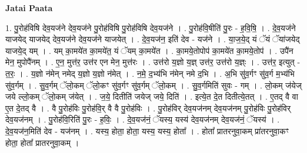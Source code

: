 \documentclass[17pt]{extarticle}
\begin{document}
\textbf{Jatai Paata} \newline

1. पु॒रोह॑विषि देव॒यज॑ने देव॒यज॑ने पु॒रोह॑विषि पु॒रोह॑विषि देव॒यज॑ने । . पु॒रोह॑वि॒षीति॑ पु॒रः - ह॒वि॒षि॒ । . दे॒व॒यज॑ने याजयेद् याजयेद् देव॒यज॑ने देव॒यज॑ने याजयेत् । . दे॒व॒यज॑न॒ इति॑ देव - यज॑ने । . या॒ज॒ये॒द् यं ॅयं ॅया॑जयेद् याजये॒द् यम् । . यम् का॒मये॑त का॒मये॑त॒ यं ॅयम् का॒मये॑त । . का॒मये॒तोपोप॑ का॒मये॑त का॒मये॒तोप॑ । . उपै॑न मेन॒ मुपोपै॑नम् । . ए॒न॒ मुत्त॑र॒ उत्त॑र एन मेन॒ मुत्त॑रः । . उत्त॑रो य॒ज्ञो य॒ज्ञ् उत्त॑र॒ उत्त॑रो य॒ज्ञ्ः । . उत्त॑र॒ इत्युत् - त॒रः॒ । . य॒ज्ञो न॑मेन् नमेद् य॒ज्ञो य॒ज्ञो न॑मेत् । . न॒मे॒ द॒भ्य॑भि न॑मेन् नमे द॒भि । . अ॒भि सु॑व॒र्गꣳ सु॑व॒र्ग म॒भ्य॑भि सु॑व॒र्गम् । . सु॒व॒र्गम् ॅलो॒कम् ॅलो॒कꣳ सु॑व॒र्गꣳ सु॑व॒र्गम् ॅलो॒कम् । . सु॒व॒र्गमिति॑ सुवः - गम् । . लो॒कम् ज॑येज् जये ल्लो॒कम् ॅलो॒कम् ज॑येत् । . ज॒ये॒ दितीति॑ जयेज् जये॒ दिति॑ । . इत्ये॒त दे॒त दितीत्ये॒तत् । . ए॒तद् वै वा ए॒त दे॒तद् वै । . वै पु॒रोह॑विः पु॒रोह॑वि॒र् वै वै पु॒रोह॑विः । . पु॒रोह॑विर् देव॒यज॑नम् देव॒यज॑नम् पु॒रोह॑विः पु॒रोह॑विर् देव॒यज॑नम् । . पु॒रोह॑वि॒रिति॑ पु॒रः - ह॒विः॒ । . दे॒व॒यज॑नं॒ ॅयस्य॒ यस्य॑ देव॒यज॑नम् देव॒यज॑नं॒ ॅयस्य॑ । . दे॒व॒यज॑न॒मिति॑ देव - यज॑नम् । . यस्य॒ होता॒ होता॒ यस्य॒ यस्य॒ होता᳚ । . होता᳚ प्रातरनुवा॒कम् प्रा॑तरनुवा॒कꣳ होता॒ होता᳚ प्रातरनुवा॒कम् । \newline
\end{document}
